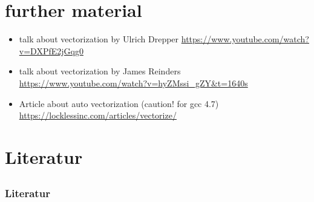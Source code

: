 \documentclass[compress]{beamer}
\begin{document}
\section{further material}
\begin{frame}
    \begin{itemize} 
                \setlength\itemsep{1em}
        \item talk about vectorization by Ulrich Drepper \newline
            \url{https://www.youtube.com/watch?v=DXPfE2jGqg0}
        \item talk about vectorization by James Reinders \newline
            \url{https://www.youtube.com/watch?v=hyZMssi_gZY&t=1640s}
        \item Article about auto vectorization (caution!  for gcc 4.7) \newline
            \url{https://locklessinc.com/articles/vectorize/}
    \end{itemize}

\end{frame}

\section{Literatur}
\subsection*{}

\begin{frame}
	\frametitle{Literatur}

	
	
\end{frame}
\end{document}
